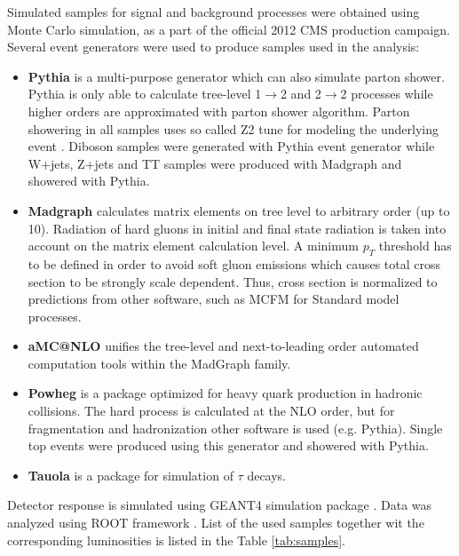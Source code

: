 \par Simulated samples for signal and background processes were obtained using Monte Carlo simulation, as a part of the official 2012 CMS production campaign. Several event generators were used to produce samples used in the analysis:
\begin{itemize}
\item \textbf{Pythia} \cite{Sjostrand:2006za,Sjostrand:2007gs} is a multi-purpose generator which can also simulate parton shower. Pythia is only able to calculate tree-level 1$\rightarrow$2 and 2$\rightarrow$2 processes while higher orders are approximated with parton shower algorithm. Parton showering in all samples uses so called Z2 tune for modeling the underlying event \cite{Field:2010bc,Chatrchyan:2013ala}. Diboson samples were generated with Pythia event generator while W+jets, Z+jets and TT samples were produced with Madgraph and showered with Pythia.  
\item \textbf{Madgraph} \cite{Alwall:2011uj} calculates matrix elements on tree level to arbitrary order (up to 10). Radiation of hard gluons in initial and final state radiation is taken into account on the matrix element calculation level. A minimum $p_T$ threshold has to be defined in order to avoid soft gluon emissions which causes total cross section to be strongly scale dependent. Thus, cross section is normalized to predictions from other software, such as MCFM\cite{Campbell:2010ff} for Standard model processes.   
\item \textbf{aMC@NLO} \cite{Alwall:2014hca} unifies the tree-level and next-to-leading order automated computation tools within the MadGraph family.
\item \textbf{Powheg} \cite{Oleari:2010nx} is a package optimized for heavy quark production in hadronic collisions. The hard process is calculated at the NLO order, but for fragmentation and hadronization other software is used (e.g. Pythia). Single top events were produced using this generator and showered with Pythia. 
\item \textbf{Tauola} \cite{Jadach:1993hs} is a package for simulation of $\tau$ decays.
\end{itemize}
        
Detector response is simulated using GEANT4 simulation package \cite{Agostinelli:2002hh}. Data was analyzed using ROOT framework \cite{Brun:1997pa}. List of the used samples together wit the corresponding luminosities is listed in the Table \ref{tab:samples}.

